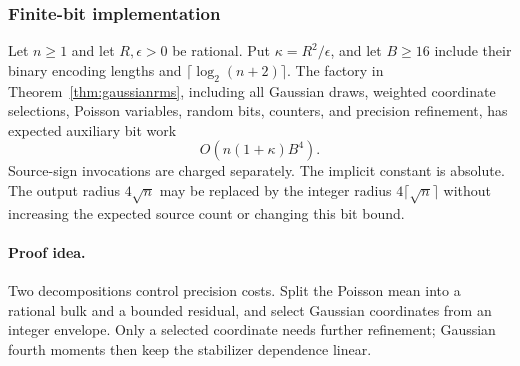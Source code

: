\subsubsection{Finite-bit implementation}
\label{sec:gaussian-rms-bits}

\begin{lemma}
\label{lem:gaussianrmsbits}
Let $n\ge1$ and let $R,\epsilon>0$ be rational. Put
$\kappa=R^2/\epsilon$, and let $B\ge16$ include their binary encoding
lengths and $\lceil\log_2(n+2)\rceil$. The factory in
Theorem~\ref{thm:gaussianrms}, including all Gaussian draws, weighted
coordinate selections, Poisson variables, random bits, counters, and
precision refinement, has expected auxiliary bit work
\begin{equation}
 O\!\left(n(1+\kappa)B^4\right).
 \label{eq:gaussianrmsbits}
\end{equation}
Source-sign invocations are charged separately. The implicit constant
is absolute. The output radius $4\sqrt n$ may be replaced by the
integer radius $4\lceil\sqrt n\rceil$ without increasing the expected
source count or changing this bit bound.
\end{lemma}
\paragraph{Proof idea.}
Two decompositions control precision costs. Split the Poisson mean
into a rational bulk and a bounded residual, and select Gaussian coordinates
from an integer envelope. Only a selected coordinate needs further
refinement; Gaussian fourth moments then keep the stabilizer dependence
linear.

